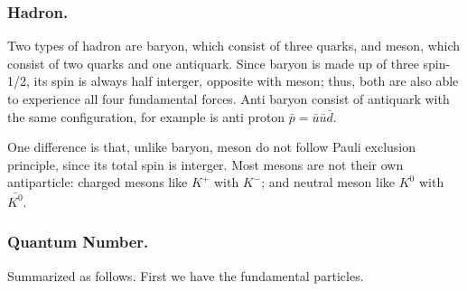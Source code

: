 \documentclass[../../../main.tex]{subfiles}
\begin{document}
\subsubsection{Hadron.} Two types of hadron are baryon, which consist of three quarks, and meson, which consist of two quarks and one antiquark. Since baryon is made up of three spin-1/2, its spin is always half interger, opposite with meson; thus, both are also able to experience all four fundamental forces. Anti baryon consist of antiquark with the same configuration, for example is anti proton $\bar{p}=\bar{u}\bar{u}\bar{d}$.

One difference is that, unlike baryon, meson do not follow Pauli exclusion principle, since its total spin is interger. Most mesons are not their own antiparticle: charged mesons  like $K^+$ with $K^-$; and neutral meson like $K^0$ with $\bar{K^0}$.

\subsubsection{Quantum Number.} Summarized as follows. First we have the fundamental particles. 
\end{document}
